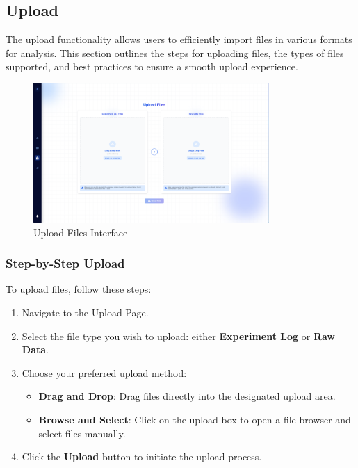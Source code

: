 \documentclass[12pt]{article}
\begin{document}
\subsection{Upload}

The upload functionality allows users to efficiently import files in various
formats for analysis. This section outlines the steps for uploading files, the
types of files supported, and best practices to ensure a smooth upload
experience.

\begin{figure}[H]
    \centering
    \includegraphics[width=0.8\textwidth]{./Diagrams/Upload.png}
    \caption{Upload Files Interface}
\end{figure}

\subsubsection{Step-by-Step Upload}
To upload files, follow these steps:
\begin{enumerate}
    \item Navigate to the Upload Page.
    \item Select the file type you wish to upload: either \textbf{Experiment
    Log} or \textbf{Raw Data}.
    \item Choose your preferred upload method:
    \begin{itemize}
        \item \textbf{Drag and Drop}: Drag files directly into the designated
        upload area.
        \item \textbf{Browse and Select}: Click on the upload box to open a file
        browser and select files manually.
    \end{itemize}
    \item Click the \textbf{Upload} button to initiate the upload process.
\end{enumerate}
\end{document}
